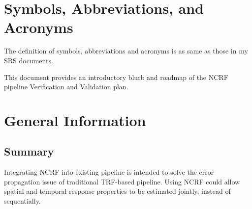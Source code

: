 \documentclass[12pt, titlepage]{article}
\begin{document}

\newpage

\section{Symbols, Abbreviations, and Acronyms}




The definition of symbols, abbreviations and acronyms is as same as those in my SRS documents.

\newpage


This document provides an introductory blurb and roadmap of the NCRF pipeline Verification and Validation plan.

\section{General Information}

\subsection{Summary}

Integrating NCRF into existing pipeline is intended to solve the error propagation issue of
traditional TRF-based pipeline. Using NCRF could allow spatial and temporal response
properties to be estimated jointly, instead of sequentially.
\end{document}
